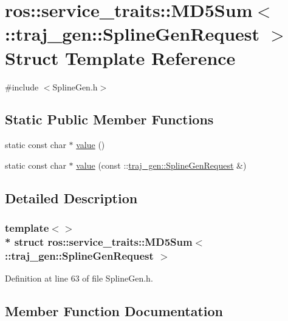 \hypertarget{structros_1_1service__traits_1_1_m_d5_sum_3_01_1_1traj__gen_1_1_spline_gen_request_01_4}{}\section{ros\+:\+:service\+\_\+traits\+:\+:M\+D5\+Sum$<$ \+:\+:traj\+\_\+gen\+:\+:Spline\+Gen\+Request $>$ Struct Template Reference}
\label{structros_1_1service__traits_1_1_m_d5_sum_3_01_1_1traj__gen_1_1_spline_gen_request_01_4}


{\ttfamily \#include $<$Spline\+Gen.\+h$>$}

\subsection*{Static Public Member Functions}
\begin{DoxyCompactItemize}
\item 
static const char $\ast$ \hyperlink{structros_1_1service__traits_1_1_m_d5_sum_3_01_1_1traj__gen_1_1_spline_gen_request_01_4_aa58c65f614a7d590e07bb2f621e21b04}{value} ()
\item 
static const char $\ast$ \hyperlink{structros_1_1service__traits_1_1_m_d5_sum_3_01_1_1traj__gen_1_1_spline_gen_request_01_4_ab292a8403a510bfdbc71a709a646535a}{value} (const \+::\hyperlink{namespacetraj__gen_a61c65203f503c18d4b3cb68b9ee74a74}{traj\+\_\+gen\+::\+Spline\+Gen\+Request} \&)
\end{DoxyCompactItemize}


\subsection{Detailed Description}
\subsubsection*{template$<$$>$\\*
struct ros\+::service\+\_\+traits\+::\+M\+D5\+Sum$<$ \+::traj\+\_\+gen\+::\+Spline\+Gen\+Request $>$}



Definition at line 63 of file Spline\+Gen.\+h.



\subsection{Member Function Documentation}
